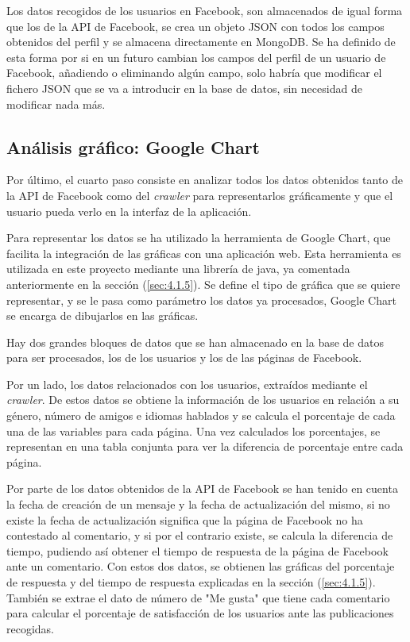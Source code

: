 Los datos recogidos de los usuarios en Facebook, son almacenados de igual forma que los de la API de Facebook, se crea un objeto JSON con todos los campos obtenidos del perfil y se almacena directamente en MongoDB. Se ha definido de esta forma por si en un futuro cambian los campos del perfil de un usuario de Facebook, añadiendo o eliminando algún campo, solo habría que modificar el fichero JSON que se va a introducir en la base de datos, sin necesidad de modificar nada más. 

\subsection{Análisis gráfico: Google Chart}

Por último, el cuarto paso consiste en analizar todos los datos obtenidos tanto de la API de Facebook como del \textit{crawler} para representarlos gráficamente y que el usuario pueda verlo en la interfaz de la aplicación. 

Para representar los datos se ha utilizado la herramienta de Google Chart, que facilita la integración de las gráficas con una aplicación web. Esta herramienta es utilizada en este proyecto mediante una librería de java, ya comentada anteriormente en la sección (\ref{sec:4.1.5}). Se define el tipo de gráfica que se quiere representar, y se le pasa como parámetro los datos ya procesados, Google Chart se encarga de dibujarlos en las gráficas.

Hay dos grandes bloques de datos que se han almacenado en la base de datos para ser procesados, los de los usuarios y los de las páginas de Facebook. 

Por un lado, los datos relacionados con los usuarios, extraídos mediante el \textit{crawler}. De estos datos se obtiene la información de los usuarios en relación a su género, número de amigos e idiomas hablados y se calcula el porcentaje de cada una de las variables para cada página. Una vez calculados los porcentajes, se representan en una tabla conjunta para ver la diferencia de porcentaje entre cada página. 

Por parte de los datos obtenidos de la API de Facebook se han tenido en cuenta la fecha de creación de un mensaje y la fecha de actualización del mismo, si no existe la fecha de actualización significa que la página de Facebook no ha contestado al comentario, y si por el contrario existe, se calcula la diferencia de tiempo, pudiendo así obtener el tiempo de respuesta de la página de Facebook ante un comentario. Con estos dos datos, se obtienen las gráficas del porcentaje de respuesta y del tiempo de respuesta explicadas en la sección (\ref{sec:4.1.5}). También se extrae el dato de número de "Me gusta" que tiene cada comentario para calcular el porcentaje de satisfacción de los usuarios ante las publicaciones recogidas. 
